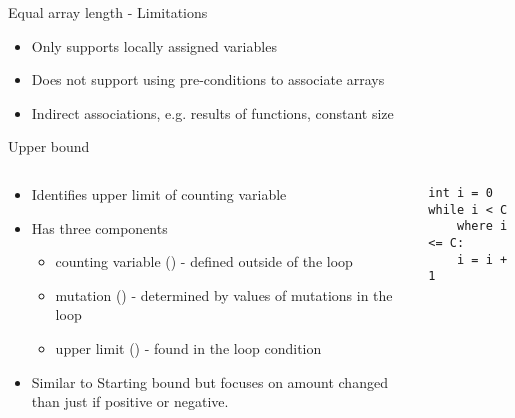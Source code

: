 \begin{frame}[fragile]{Equal array length - Limitations}

\begin{itemize}
    \item Only supports locally assigned variables
    \item Does not support using pre-conditions to associate arrays
    \item Indirect associations, e.g. results of functions, constant size
\end{itemize}

\end{frame}



\begin{frame}[fragile]{Upper bound}

\begin{columns}

\begin{column}{0.5\textwidth}
\begin{itemize}
\item Identifies upper limit of counting variable
\item Has three components
\begin{itemize}
    \item counting variable () - defined outside of the loop 
    \item mutation (\code{<=}) - determined by values of mutations in the loop
    \item upper limit () - found in the loop condition
\end{itemize}
\item Similar to Starting bound but focuses on amount changed than just
    if positive or negative.
\end{itemize}
\end{column}

\begin{column}{0.5\textwidth}
\begin{verbatim}
int i = 0
while i < C
    where i <= C:
    i = i + 1
\end{verbatim}
\end{column}

\end{columns}

\end{frame}



